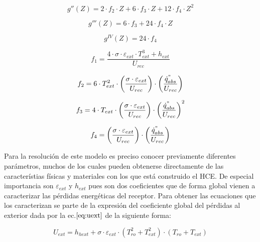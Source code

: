 \documentclass[11pt]{article}
\begin{document}
\begin{equation}
    g''(Z) = 2 \cdot f_{2} \cdot Z + 6 \cdot f_{3} \cdot Z + 12 \cdot f_{4} \cdot Z^{2} 
    \label{eq:g2primadezeta}
\end{equation}

\begin{equation}
    g'''(Z) = 6 \cdot f_{3} + 24 \cdot f_{4} \cdot Z
    \label{eq:g3primadezeta}
\end{equation}

\begin{equation}
    g^{IV}(Z) = 24 \cdot f_{4}
    \label{eq:g4primadezeta}
\end{equation}

\begin{equation}
    f_{1} = \frac{4 \cdot \sigma \cdot \varepsilon_{ext} \cdot T_{ext}^{3} + h_{ext}}{U_{rec}}
    \label{eq:f1}
\end{equation}

\begin{equation}
    f_{2} = 6 \cdot T_{ext}^{2} \cdot \left(\frac{\sigma \cdot \varepsilon_{ext}}{U_{rec}} \right) \cdot \left(\frac{\dot{q}^{"}_{abs}}{U_{rec}}\right) 
    \label{eq:f2}
\end{equation}

\begin{equation}
    f_{3} = 4 \cdot T_{ext} \cdot \left(\frac{\sigma \cdot \varepsilon_{ext}}{U_{rec}} \right) \cdot \left(\frac{\dot{q}^{"}_{abs}}{U_{rec}}\right)^{2} 
    \label{eq:f3}
\end{equation}

\begin{equation}
    f_{4} = \left(\frac{\sigma \cdot \varepsilon_{ext}}{U_{rec}} \right) \cdot \left(\frac{\dot{q}^{"}_{abs}}{U_{rec}}\right) 
    \label{eq:f4}
\end{equation}

Para la resolución de este modelo es preciso conocer previamente
diferentes parámetros, muchos de los cuales pueden obtenerse
directamente de las característias físicas y materiales con los que está
construido el HCE. De especial importancia son \(\varepsilon_{ext}\) y
\(h_{ext}\) pues son dos coeficientes que de forma global vienen a
caracterizar las pérdidas energéticas del receptor. Para obtener las
ecuaciones que los caracterizan se parte de la expresión del coeficiente
global del pérdidas al exterior dada por la ec.\(\eqref{eq:uext}\) de la
siguiente forma:

\begin{equation}
    U_{ext} = h_{hext} + \sigma \cdot \varepsilon_{ext} \cdot \left(T_{ro}^2 + T_{ext}^2 \right) \cdot \left(T_{ro} + T_{ext} \right)
    \label{eq:uext}
\end{equation}
\end{document}
